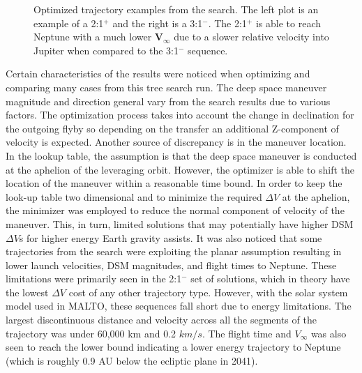 \documentclass[letterpaper, preprint, paper,11pt]{AAS}	%
\newcommand*\circled[1]{\tikz[baseline=(char.base)]{
            \node[shape=circle,draw,inner sep=0.8pt] (char) {#1};}}
\begin{document}
\begin{figure}[htb]
\begin{subfigure}
    \end{subfigure}
    \caption{Optimized trajectory examples from the search. The left plot is an example of a 2:1$^{+}$ and the right is a 3:1$^{-}$. The 2:1$^{+}$ is able to reach Neptune with a much lower $\boldsymbol{V_\infty}$ due to a slower relative velocity into Jupiter when compared to the 3:1$^{-}$ sequence.}
    \label{fig:maltotriton}
\end{figure}

Certain characteristics of the results were noticed when optimizing and comparing many cases from this tree search run. The deep space maneuver magnitude and direction general vary from the search results due to various factors. The optimization process takes into account the change in declination for the outgoing flyby so depending on the transfer an additional Z-component of velocity is expected. Another source of discrepancy is in the maneuver location. In the lookup table, the assumption is that the deep space maneuver is conducted at the aphelion of the leveraging orbit. However, the optimizer is able to shift the location of the maneuver within a reasonable time bound. In order to keep the look-up table two dimensional and to minimize the required $\Delta V$ at the aphelion, the minimizer was employed to reduce the normal component of velocity of the maneuver. This, in turn, limited solutions that may potentially have higher DSM $\Delta V$s for higher energy Earth gravity assists. It was also noticed that some trajectories from the search were exploiting the planar assumption resulting in lower launch velocities, DSM magnitudes, and flight times to Neptune. These limitations were primarily seen in the 2:1$^{-}$ set of solutions, which in theory have the lowest $\Delta V$ cost of any other trajectory type. However, with the solar system model used in MALTO, these sequences fall short due to energy limitations. The largest discontinuous distance and velocity across all the segments of the trajectory was under 60,000 km and 0.2 $km/s$. The flight time and $V_\infty$ was also seen to reach the lower bound indicating a lower energy trajectory to Neptune (which is roughly 0.9 AU below the ecliptic plane in 2041).
\end{document}
